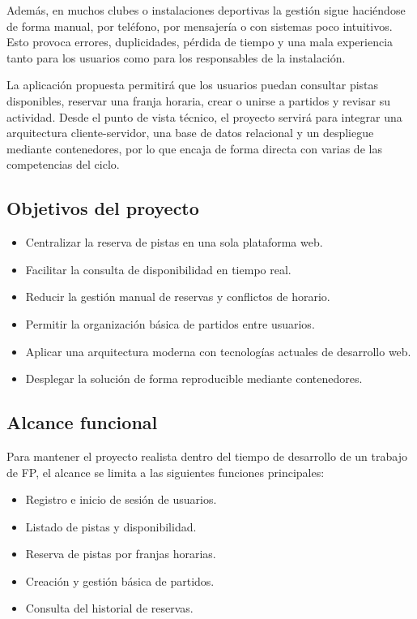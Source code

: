 \documentclass[12pt,a4paper]{article}
\begin{document}
Además, en muchos clubes o instalaciones deportivas la gestión sigue haciéndose de forma manual, por teléfono, por mensajería o con sistemas poco intuitivos. Esto provoca errores, duplicidades, pérdida de tiempo y una mala experiencia tanto para los usuarios como para los responsables de la instalación.

La aplicación propuesta permitirá que los usuarios puedan consultar pistas disponibles, reservar una franja horaria, crear o unirse a partidos y revisar su actividad. Desde el punto de vista técnico, el proyecto servirá para integrar una arquitectura cliente-servidor, una base de datos relacional y un despliegue mediante contenedores, por lo que encaja de forma directa con varias de las competencias del ciclo.

\subsection{Objetivos del proyecto}
\begin{itemize}[leftmargin=*]
    \item Centralizar la reserva de pistas en una sola plataforma web.
    \item Facilitar la consulta de disponibilidad en tiempo real.
    \item Reducir la gestión manual de reservas y conflictos de horario.
    \item Permitir la organización básica de partidos entre usuarios.
    \item Aplicar una arquitectura moderna con tecnologías actuales de desarrollo web.
    \item Desplegar la solución de forma reproducible mediante contenedores.
\end{itemize}

\subsection{Alcance funcional}
Para mantener el proyecto realista dentro del tiempo de desarrollo de un trabajo de FP, el alcance se limita a las siguientes funciones principales:
\begin{itemize}[leftmargin=*]
    \item Registro e inicio de sesión de usuarios.
    \item Listado de pistas y disponibilidad.
    \item Reserva de pistas por franjas horarias.
    \item Creación y gestión básica de partidos.
    \item Consulta del historial de reservas.
\end{itemize}
\end{document}
